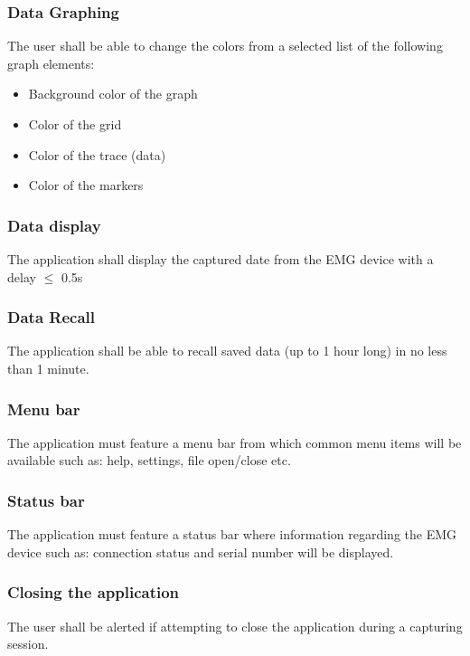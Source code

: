 \documentclass[12pt,a4paper]{article}
\begin{document}
\subsubsection{Data Graphing}

The user shall be able to change the colors from a selected list of the following graph elements:

\begin{itemize}
\item Background color of the graph
\item Color of the grid
\item Color of the trace (data)
\item Color of the markers
\end{itemize}

\subsubsection{Data display}

The application shall display the captured date from the EMG device with a delay $\leq$ 0.5s

\subsubsection{Data Recall}

The application shall be able to recall saved data (up to 1 hour long) in no less than 1 minute.

\subsubsection{Menu bar}

The application must feature a menu bar from which common menu items will be available such as: help, settings, file open/close etc.

\subsubsection{Status bar}

The application must feature a status bar where information regarding the EMG device such as: connection status and serial number will be displayed.

\subsubsection{Closing the application}

The user shall be alerted if attempting to close the application during a capturing session.
\end{document}
